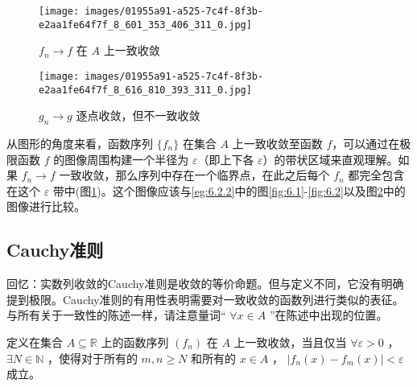 \begin{figure}[h]
  \centering
  \texttt{[image: images/01955a91-a525-7c4f-8f3b-e2aa1fe64f7f\_8\_601\_353\_406\_311\_0.jpg]}
  \caption{\({f}_{n} \rightarrow  f\) 在 \(A\) 上一致收敛}
  \label{fig:6.4}
\end{figure}


\begin{figure}[h]
  \centering
  \texttt{[image: images/01955a91-a525-7c4f-8f3b-e2aa1fe64f7f\_8\_616\_810\_393\_311\_0.jpg]}
  \caption{\({g}_{n} \rightarrow  g\) 逐点收敛，但不一致收敛}
  \label{fig:6.5}
\end{figure}

从图形的角度来看，函数序列 \(\{f_n\}\) 在集合 \(A\) 上一致收敛至函数 \(f\)，可以通过在极限函数 \(f\) 的图像周围构建一个半径为 \(\varepsilon\)（即上下各 \(\varepsilon\)）的带状区域来直观理解。如果 \({f}_{n} \rightarrow  f\) 一致收敛，那么序列中存在一个临界点，在此之后每个 \({f}_{n}\) 都完全包含在这个 \(\varepsilon\) 带中(图\ref{fig:6.4})。这个图像应该与\ref{eg:6.2.2}中的图\ref{fig:6.1}-\ref{fig:6.2}以及图\ref{fig:6.5}中的图像进行比较。

\subsection{Cauchy准则}

回忆：实数列收敛的Cauchy准则是收敛的等价命题。但与定义不同，它没有明确提到极限。Cauchy准则的有用性表明需要对一致收敛的函数列进行类似的表征。与所有关于一致性的陈述一样，请注意量词“ \(\forall x \in  A\) ”在陈述中出现的位置。


\begin{Def}[一致收敛的Cauchy准则]
  \label{thm:6.2.5}
  定义在集合 \(A \subseteq  \mathbb{R}\) 上的函数序列 \(\left( {f}_{n}\right)\) 在 \(A\) 上一致收敛，当且仅当 \(\forall \varepsilon  > 0\) ，\(\exists N \in  \mathbb{N}\) ，使得对于所有的 \(m,n \geq  N\) 和所有的 \(x \in  A\) ， \(\left| {{f}_{n}\left( x\right)  - {f}_{m}\left( x\right) }\right|  < \varepsilon\) 成立。
\end{Def}

